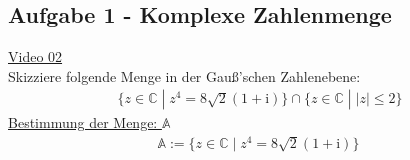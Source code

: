 \subsection{Aufgabe 1 - Komplexe Zahlenmenge}
\href{https://youtu.be/mBNzaQIcrM8}{Video 02}\\
Skizziere folgende Menge in der Gauß'schen Zahlenebene:\\
\begin{align*}
\{ z\in\mathbb{C} \;|\; z^4 =8\sqrt{2} (1+\mathrm{i})  \}\cap\{ z\in \mathbb{C}\;|\;  |z| \leq 2 \}
\end{align*}
\underline {Bestimmung der Menge: $  \mathbb{A} $}\\
\begin{align*}
\mathbb{A}:=\{ z\in\mathbb{C} \;|\; z^4 =8\sqrt{2} (1+\mathrm{i})  \}\
\end{align*}
